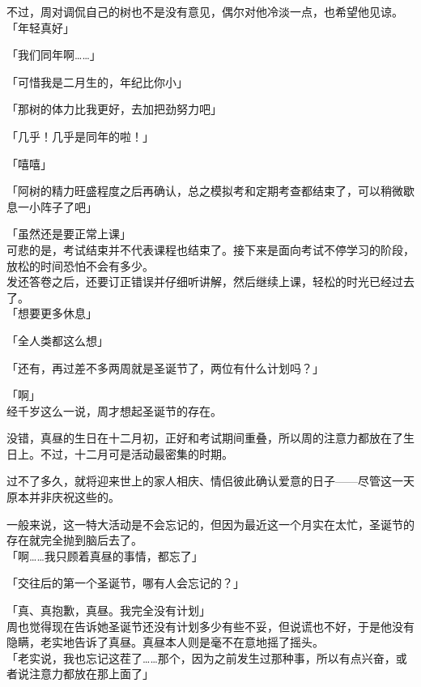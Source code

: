 不过，周对调侃自己的树也不是没有意见，偶尔对他冷淡一点，也希望他见谅。\\

「年轻真好」

「我们同年啊……」

「可惜我是二月生的，年纪比你小」

「那树的体力比我更好，去加把劲努力吧」

「几乎！几乎是同年的啦！」

「嘻嘻」

「阿树的精力旺盛程度之后再确认，总之模拟考和定期考查都结束了，可以稍微歇息一小阵子了吧」

「虽然还是要正常上课」\\

可悲的是，考试结束并不代表课程也结束了。接下来是面向考试不停学习的阶段，放松的时间恐怕不会有多少。\\

发还答卷之后，还要订正错误并仔细听讲解，然后继续上课，轻松的时光已经过去了。\\

「想要更多休息」

「全人类都这么想」

「还有，再过差不多两周就是圣诞节了，两位有什么计划吗？」

「啊」\\

经千岁这么一说，周才想起圣诞节的存在。

没错，真昼的生日在十二月初，正好和考试期间重叠，所以周的注意力都放在了生日上。不过，十二月可是活动最密集的时期。

过不了多久，就将迎来世上的家人相庆、情侣彼此确认爱意的日子——尽管这一天原本并非庆祝这些的。

一般来说，这一特大活动是不会忘记的，但因为最近这一个月实在太忙，圣诞节的存在就完全抛到脑后去了。\\

「啊……我只顾着真昼的事情，都忘了」

「交往后的第一个圣诞节，哪有人会忘记的？」


「真、真抱歉，真昼。我完全没有计划」\\


周也觉得现在告诉她圣诞节还没有计划多少有些不妥，但说谎也不好，于是他没有隐瞒，老实地告诉了真昼。真昼本人则是毫不在意地摇了摇头。\\


「老实说，我也忘记这茬了……那个，因为之前发生过那种事，所以有点兴奋，或者说注意力都放在那上面了」\\

